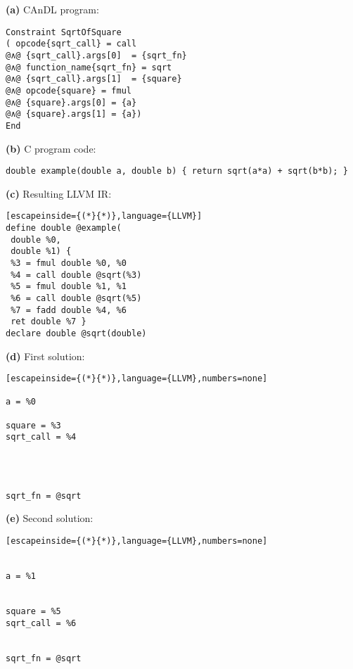 \begin{minipage}[t]{17.5cm}
\centering
\begin{minipage}[t]{6.422cm}
\centering
{\bf(a)} CAnDL program:
\begin{lstlisting}[language=CAnDL,basicstyle=\linespread{1.5565}\scriptsize\ttfamily]
Constraint SqrtOfSquare
( opcode{sqrt_call} = call
@∧@ {sqrt_call}.args[0]  = {sqrt_fn}
@∧@ function_name{sqrt_fn} = sqrt
@∧@ {sqrt_call}.args[1]  = {square}
@∧@ opcode{square} = fmul
@∧@ {square}.args[0] = {a}
@∧@ {square}.args[1] = {a})
End
\end{lstlisting}
\end{minipage}
\hfill
\begin{minipage}[t]{11cm}
\centering
\begin{minipage}[t]{11cm}
\centering
{\bf(b)} C program code:
\begin{lstlisting}
double example(double a, double b) { return sqrt(a*a) + sqrt(b*b); }
\end{lstlisting}
\end{minipage}
\begin{minipage}[t]{4.785cm}
\centering
{\bf(c)} Resulting LLVM IR:
\begin{lstlisting}[escapeinside={(*}{*)},language={LLVM}]
define double @example(    
 double %0,                
 double %1) {              
 %3 = fmul double %0, %0   
 %4 = call double @sqrt(%3)
 %5 = fmul double %1, %1   
 %6 = call double @sqrt(%5)
 %7 = fadd double %4, %6   
 ret double %7 }
declare double @sqrt(double)      
\end{lstlisting}
\end{minipage}
\hfill
\begin{minipage}[t]{3.03cm}
\centering
{\bf(d)} First solution:
\begin{lstlisting}[escapeinside={(*}{*)},language={LLVM},numbers=none]

a = %0

square = %3
sqrt_call = %4 




sqrt_fn = @sqrt
\end{lstlisting}
\end{minipage}
\hfill
\begin{minipage}[t]{3.03cm}
\centering
{\bf(e)} Second solution:
\begin{lstlisting}[escapeinside={(*}{*)},language={LLVM},numbers=none]


a = %1


square = %5
sqrt_call = %6


sqrt_fn = @sqrt
\end{lstlisting}
\end{minipage}
\end{minipage}
\end{minipage}

